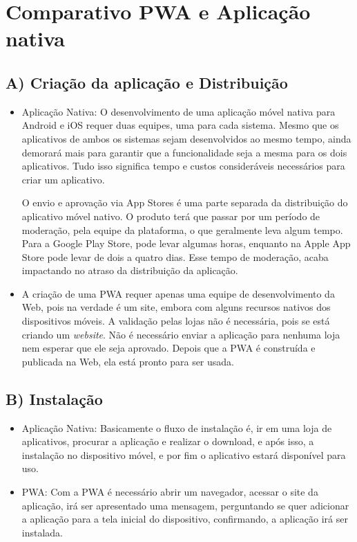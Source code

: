 \section{Comparativo PWA e Aplicação nativa}
\subsection*{A) Criação da aplicação e Distribuição}

\begin{itemize}
	\item Aplicação Nativa: O desenvolvimento de uma aplicação móvel nativa para Android e iOS requer duas equipes, uma para cada sistema. Mesmo que os aplicativos de ambos os sistemas sejam desenvolvidos ao mesmo tempo, ainda demorará mais para garantir que a funcionalidade seja a mesma para os dois aplicativos. Tudo isso significa tempo e custos consideráveis necessários para criar um aplicativo.
	
	O envio e aprovação via App Stores é uma parte separada da distribuição do aplicativo móvel nativo. O produto terá que passar por um período de moderação, pela equipe da plataforma, o que geralmente leva algum tempo. Para a Google Play Store, pode levar algumas horas, enquanto na Apple App Store pode levar de dois a quatro dias. Esse tempo de moderação, acaba impactando no atraso da distribuição da aplicação.
	
	\item A criação de uma \ac{PWA} requer apenas uma equipe de desenvolvimento da Web, pois na verdade é um site, embora com alguns recursos nativos dos dispositivos móveis. A validação pelas lojas não é necessária, pois se está criando um \textit{website}. Não é necessário enviar a aplicação para nenhuma loja nem esperar que ele seja aprovado. Depois que a \ac{PWA} é construída e publicada na Web, ela está pronto para ser usada.
	
	
	
\end{itemize}

\subsection*{B) Instalação}

\begin{itemize}

\item Aplicação Nativa: Basicamente o fluxo de instalação é, ir em uma loja de aplicativos, procurar a aplicação e realizar o download, e após isso, a instalação no dispositivo móvel, e por fim o aplicativo estará disponível para uso.

\item PWA: Com a \ac{PWA} é necessário abrir um navegador, acessar o site da aplicação, irá ser apresentado uma mensagem, perguntando se quer adicionar a aplicação para a tela inicial do dispositivo, confirmando, a aplicação irá ser instalada.
\end{itemize}

